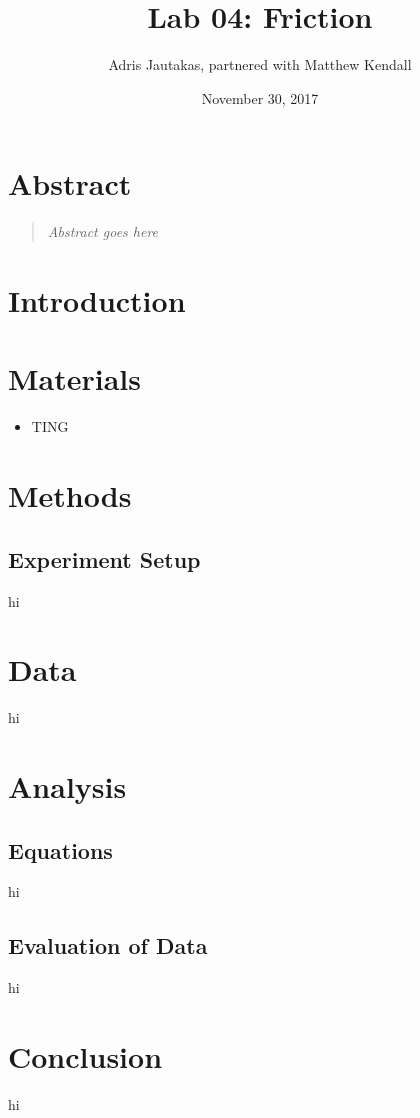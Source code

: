 \documentclass[12pt]{article}
\title{Lab 04: Friction}
\author{Adris Jautakas, partnered with Matthew Kendall}
\date{November 30, 2017}
\begin{document}
   \maketitle

    \section*{Abstract}
        \begin{quote}
        {\textit {\small 
            Abstract goes here
        } }
        \end{quote}

    \section{Introduction}
        
    \section{Materials}
        \begin{itemize}
            \item TING
        \end{itemize}

    \section{Methods}
        \subsection{Experiment Setup}
            hi
    \section{Data}
        hi
    \section{Analysis}
        \subsection{Equations}
            hi
        \subsection{Evaluation of Data}
            hi
    \section{Conclusion}
        hi
\end{document}

